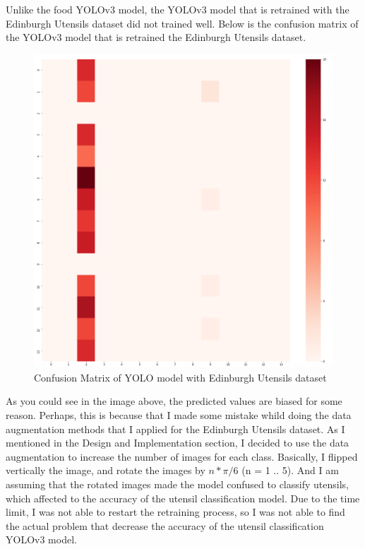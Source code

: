 \documentclass{article}
\begin{document}
Unlike the food YOLOv3 model, the YOLOv3 model that is retrained with the Edinburgh Utensils dataset did not trained well. Below is the confusion matrix of the YOLOv3 model that is retrained the Edinburgh Utensils dataset.

\begin{figure}[H]
    \centering
    \includegraphics[scale=0.4]{imgs/cm_utensils.png}
    \caption{Confusion Matrix of YOLO model with Edinburgh Utensils dataset}
    \label{fig:cm_food100}
\end{figure}

As you could see in the image above, the predicted values are biased for some reason. Perhaps, this is because that I made some mistake whild doing the data augmentation methods that I applied for the Edinburgh Utensils dataset. As I mentioned in the Design and Implementation section, I decided to use the data augmentation to increase the number of images for each class. Basically, I flipped vertically the image, and rotate the images by $n * \pi / 6$ (n = 1 .. 5). And I am assuming that the rotated images made the model confused to classify utensils, which affected to the accuracy of the utensil classification model. Due to the time limit, I was not able to restart the retraining process, so I was not able to find the actual problem that decrease the accuracy of the utensil classification YOLOv3 model.
\end{document}
